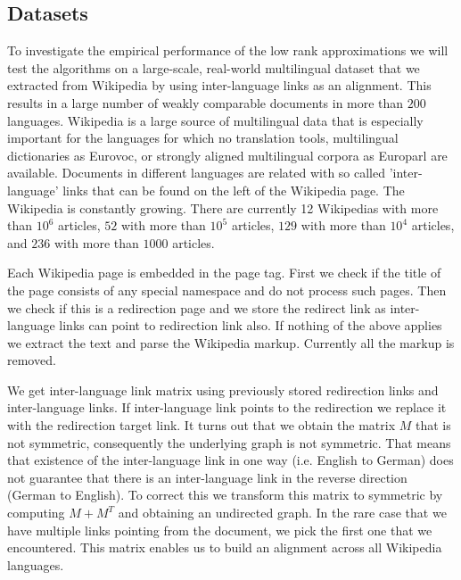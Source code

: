 \documentclass[twoside,11pt]{article}
\newcommand{\oldText}[1]{\textcolor{red}{#1:}\color{blue}}
\begin{document}
\subsection{Datasets}
To investigate the empirical performance of the low rank approximations we will test the algorithms on a large-scale, real-world multilingual dataset that we extracted from Wikipedia by using inter-language links as an alignment. This  results in a large number of weakly comparable documents in more than $200$ languages. Wikipedia is a large source of multilingual data that is especially important for the languages for which no translation tools, multilingual dictionaries as Eurovoc, or strongly aligned multilingual corpora as Europarl are available. Documents in different languages are related with so called 'inter-language' links that can be found on the left of the Wikipedia page. The Wikipedia is constantly growing. There are currently 12 Wikipedias with more than $10^6$ articles, $52$ with more than $10^5$ articles, $129$ with more than $10^4$ articles, and $236$ with more than $1000$ articles.

Each Wikipedia page is embedded in the page tag. First we check if the title of the page consists of any special namespace and do not process such pages. Then we check if this is a redirection page and we store the redirect link as inter-language links can point to redirection link also. If nothing of the above applies we extract the text and parse the Wikipedia markup. Currently all the markup is removed.

We get inter-language link matrix using previously stored redirection links and inter-language links. If inter-language link points to the redirection we replace it with the redirection target link. It turns out that we obtain the matrix $M$ that is not symmetric, consequently the underlying graph is not symmetric. That means that existence of the inter-language link in one way (i.e. English to German) does not guarantee that there is an inter-language link in the reverse direction (German to English). To correct this we transform this matrix to symmetric by computing $M+M^T$ and obtaining an undirected graph. In the rare case that we have multiple links pointing from the document, we pick the first one that we encountered. This matrix enables us to build an alignment across all Wikipedia languages.
\end{document}
